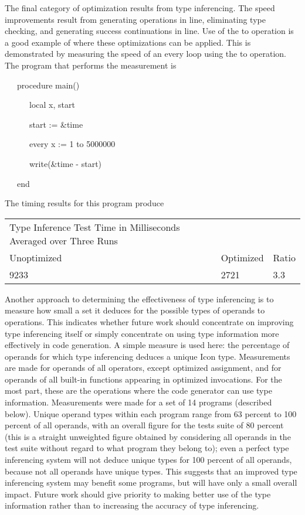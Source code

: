 The final category of optimization results from type inferencing. The
speed improvements result from generating operations in line,
eliminating type checking, and generating success continuations in
line. Use of the to operation is a good example of where these
optimizations can be applied. This is demonstrated by measuring the
speed of an every loop using the to operation. The program that
performs the measurement is

{\ttfamily\mdseries
\ \ \ procedure main()}

{\ttfamily\mdseries
\ \ \ \ \ \ local x, start}

{\ttfamily\mdseries
\ \ \ \ \ \ start := \&time}

{\ttfamily\mdseries
\ \ \ \ \ \ every x := 1 to 5000000}

{\ttfamily\mdseries
\ \ \ \ \ \ write(\&time - start)}

{\ttfamily\mdseries
\ \ \ end}


The timing results for this program produce 

\begin{center}
\tablefirsthead{}
\tablehead{}
\tabletail{}
\tablelasttail{}
\begin{supertabular}{m{3.2691598in}m{0.6830598in}m{0.33445984in}}
 Type Inference Test\newline
Time in Milliseconds Averaged over Three Runs &
~
 &
~
\\
 Unoptimized &
 Optimized &
 Ratio\\
 9233  &
 2721  &
 3.3 \\
\end{supertabular}
\end{center}

Another approach to determining the effectiveness of type inferencing
is to measure how small a set it deduces for the possible types of
operands to operations. This indicates whether future work should
concentrate on improving type inferencing itself or simply concentrate
on using type information more effectively in code generation. A
simple measure is used here: the percentage of operands for which type
inferencing deduces a unique Icon type. Measurements are made for
operands of all operators, except optimized assignment, and for
operands of all built-in functions appearing in optimized
invocations. For the most part, these are the operations where the
code generator can use type information. Measurements were made for a
set of 14 programs (described below). Unique operand types within each
program range from 63 percent to 100 percent of all operands, with an
overall figure for the tests suite of 80 percent (this is a straight
unweighted figure obtained by considering all operands in the test
suite without regard to what program they belong to); even a perfect
type inferencing system will not deduce unique types for 100 percent
of all operands, because not all operands have unique types. This
suggests that an improved type inferencing system may benefit some
programs, but will have only a small overall impact. Future work
should give priority to making better use of the type information
rather than to increasing the accuracy of type inferencing.



